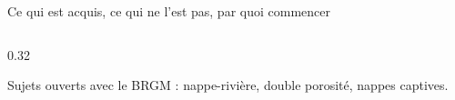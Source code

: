 \documentclass[aspectratio=169,11pt]{beamer}
\begin{document}
\begin{frame}{Ce qui est acquis, ce qui ne l'est pas, par quoi commencer}
\begin{columns}[T]
\begin{column}{0.32\textwidth}
\vspace{0.3em}
{\scriptsize\color{grisardoise} Sujets ouverts avec le BRGM : nappe-rivière, double porosité,
nappes captives.\par}
\end{column}
\end{columns}
\end{frame}
\end{document}

